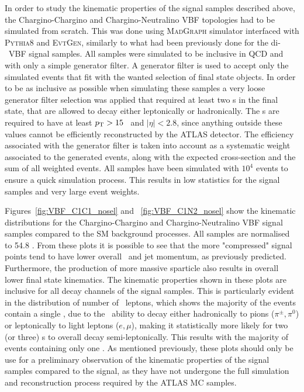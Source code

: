 	 In order to study the kinematic properties of the signal samples described above, the Chargino-Chargino and Chargino-Neutralino \ac{VBF} topologies had to be simulated from scratch. This was done using \textsc{MadGraph} simulator interfaced with \textsc{Pythia8} and \textsc{Evt\-Gen}, similarly to what had been previously done for the di-\stau\ \ac{VBF} signal samples. All samples were simulated to be inclusive in \ac{QCD} and with only a simple generator filter. 
	 A generator filter is used to accept only the simulated events that fit with the wanted selection of final state objects. 
	 In order to be as inclusive as possible when simulating these samples a very loose generator filter selection was applied that required at least two \ltau s in the final state, that are allowed to decay either leptonically or hadronically. 
	 The \ltau s are required to have at least $p_{\mathrm{T}} >15$ \gev\ and $|\eta| < 2.8$, since anything outside these values cannot be efficiently reconstructed by the \ac{ATLAS} detector. 
	 The efficiency associated with the generator filter is taken into account as a systematic weight associated to the generated events, along with the expected cross-section and the sum of all weighted events.
	 All samples have been simulated with $10^4$ events to ensure a quick simulation process. 
	 This results in low statistics for the signal samples and very large event weights. 
	
	 Figures~\ref{fig:VBF_C1C1_nosel} and ~\ref{fig:VBF_C1N2_nosel} show the kinematic distributions for the Chargino-Chargino and Chargino-Neutralino \ac{VBF} signal samples compared to the \ac{SM} background processes. All samples are normalised to 54.8 \infb.
	 From these plots it is possible to see that the more "compressed" signal points tend to have lower overall \ltau\ and jet momentum, as previously predicted. 
	 Furthermore, the production of more massive sparticle also results in overall lower final state kinematics. 
	 The kinematic properties shown in these plots are inclusive for all decay channels of the signal samples. 
	 This is particularly evident in the distribution of number of \htau\ leptons, which shows the majority of the events contain a single \htau, due to the \ltau\ ability to decay either hadronically to pions ($\pi^{\pm},\pi^{0}$) or leptonically to light leptons ($e,\mu$), making it statistically more likely for two (or three) \ltau s to overall decay semi-leptonically. 
	 This results with the majority of events containing only one \htau.
	 As mentioned previously, these plots should only be use for a preliminary observation of the kinematic properties of the signal samples compared to the signal, as they have not undergone the full simulation and reconstruction process required by the \ac{ATLAS} \ac{MC} samples. 
	\VBFCCNoSelection
	\VBFCNNoSelection
	
